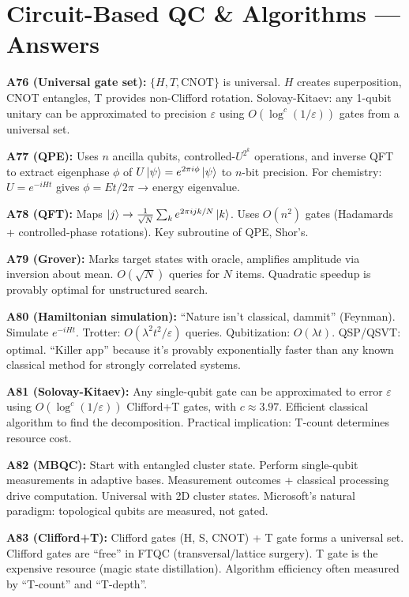 \documentclass[11pt,a4paper]{article}
\begin{document}
\section{Circuit-Based QC \& Algorithms --- Answers}

\begin{answerbox}
\textbf{A76 (Universal gate set):} $\{H, T, \text{CNOT}\}$ is universal. $H$ creates superposition, CNOT entangles, T provides non-Clifford rotation. Solovay-Kitaev: any 1-qubit unitary can be approximated to precision $\varepsilon$ using $O(\log^c(1/\varepsilon))$ gates from a universal set.

\textbf{A77 (QPE):} Uses $n$ ancilla qubits, controlled-$U^{2^k}$ operations, and inverse QFT to extract eigenphase $\phi$ of $U\ket{\psi} = e^{2\pi i \phi}\ket{\psi}$ to $n$-bit precision. For chemistry: $U = e^{-iHt}$ gives $\phi = Et/2\pi$ → energy eigenvalue.

\textbf{A78 (QFT):} Maps $\ket{j} \to \frac{1}{\sqrt{N}} \sum_k e^{2\pi ijk/N} \ket{k}$. Uses $O(n^2)$ gates (Hadamards + controlled-phase rotations). Key subroutine of QPE, Shor's.

\textbf{A79 (Grover):} Marks target states with oracle, amplifies amplitude via inversion about mean. $O(\sqrt{N})$ queries for $N$ items. Quadratic speedup is provably optimal for unstructured search.

\textbf{A80 (Hamiltonian simulation):} ``Nature isn't classical, dammit'' (Feynman). Simulate $e^{-iHt}$. Trotter: $O(\lambda^2 t^2 / \varepsilon)$ queries. Qubitization: $O(\lambda t)$. QSP/QSVT: optimal. ``Killer app'' because it's provably exponentially faster than any known classical method for strongly correlated systems.

\textbf{A81 (Solovay-Kitaev):} Any single-qubit gate can be approximated to error $\varepsilon$ using $O(\log^c(1/\varepsilon))$ Clifford+T gates, with $c \approx 3.97$. Efficient classical algorithm to find the decomposition. Practical implication: T-count determines resource cost.

\textbf{A82 (MBQC):} Start with entangled cluster state. Perform single-qubit measurements in adaptive bases. Measurement outcomes + classical processing drive computation. Universal with 2D cluster states. Microsoft's natural paradigm: topological qubits are measured, not gated.

\textbf{A83 (Clifford+T):} Clifford gates (H, S, CNOT) + T gate forms a universal set. Clifford gates are ``free'' in FTQC (transversal/lattice surgery). T gate is the expensive resource (magic state distillation). Algorithm efficiency often measured by ``T-count'' and ``T-depth''.


\end{answerbox}
\end{document}
